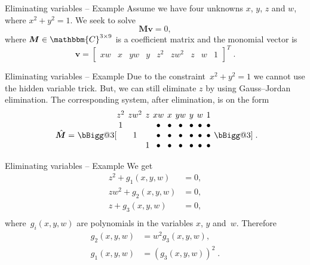 \documentclass[aspectratio=169]{beamer}
\makeatletter
\newcommand{\HUGE}{\bBigg@{3}}
\newcommand{\C}{\ensuremath{\mathbbm{C}}}
\newcommand{\mat}[1]{\bm{#1}}
\newcommand{\T}{T}
\makeatother
\begin{document}
\begin{frame}{Eliminating variables -- Example}
Assume we have four unknowns $x$, $y$, $z$ and $w$, where $x^2+y^2=1$. We seek to solve
\begin{equation*}
    \mat{M}\mat{v} = 0,
\end{equation*}
where $\mat{M}\in\C^{3\times 9}$ is a coefficient matrix and the monomial vector is
\setcounter{MaxMatrixCols}{20}
\begin{equation*}
    \mat{v} = \begin{bmatrix}
            xw & x &
            yw & y &
            z^2 & zw^2 & z &
            w & 1
        \end{bmatrix}^\T\;.
\end{equation*}
\end{frame}

\begin{frame}{Eliminating variables -- Example}
Due to the constraint~$x^2+y^2=1$ we cannot use the hidden variable trick. But, we can still
eliminate $z$ by using Gauss--Jordan elimination. The corresponding system, after elimination, is
on the form
\begin{equation*}
\raisebox{-6pt}{ $\hat{\mat{M}} =$ }
\raisebox{-6pt}{\HUGE[}
\begingroup %
\setlength\arraycolsep{2pt}
\begin{matrix}
z^2 & zw^2 & z & xw & x & yw & y & w & 1\\
    1 & & & \bullet & \bullet & \bullet & \bullet & \bullet & \bullet & \\
    & 1 & & \bullet & \bullet & \bullet & \bullet & \bullet & \bullet & \\
    & & 1 & \bullet & \bullet & \bullet & \bullet & \bullet & \bullet &
\end{matrix}
\endgroup
\raisebox{-6pt}{\HUGE]\;.}
\end{equation*}
\end{frame}

\begin{frame}{Eliminating variables -- Example}
We get
\begin{equation*}\label{paper04:eq:elim}
    \begin{aligned}
    z^2 + g_1(x,y,w)  &=  0,\\
    zw^2 + g_2(x,y,w)  &=  0,\\
    z + g_3(x,y,w)  &=  0,\\
    \end{aligned}
\end{equation*}
where~$g_i(x,y,w)$ are polynomials in the variables $x$, $y$ and~$w$.
Therefore
\begin{equation*}\label{paper04:eq:knowntilt1}
\begin{aligned}
    g_2(x,y,w) &= w^2 g_3(x,y,w), \\
    g_1(x,y,w) &= \left(g_3(x,y,w)\right)^2\;.
\end{aligned}
\end{equation*}
\end{frame}
\end{document}
